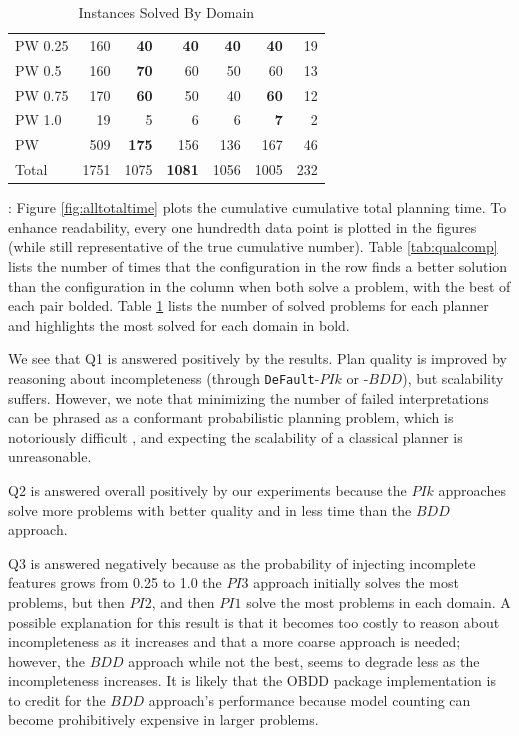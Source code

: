 \documentclass[letterpaper]{article}
\def\und#1{\noindent{\bf #1}:}
\def\default{{\tt DeFault}}
\def\citep#1{\cite{#1}}
\begin{document}
\begin{table}[t]
\begin{tabular}{|l|r|r@{ }r@{ }r@{ }r|r|}
PW 0.25 	&		160		&	{\bf	40}	&	{\bf	40}	&	{\bf	40}	&	{\bf	40}	&	19	\\	
PW 0.5 	&		160		&	{\bf	70}	&		60		&		50		&		60		&	13	\\	
PW 0.75 	&		170		&	{\bf	60}	&		50		&		40		&	{\bf	60}	&	12	\\	
PW 1.0 	&		19		&		5		&		6		&		6		&	{\bf	7}	&	2	\\	\hline
PW 	&		509		&	{\bf	175}	&		156		&		136		&		167		&	46	\\	\hline\hline
Total	&		1751		&		1075		&	{\bf	1081}	&		1056		&		1005		&	232	\\	
\hline																								
\end{tabular}	\caption{\label{tab:solved} Instances Solved By Domain}																							
\end{table}																																												



\und{Off-line Planning Results} Figure \ref{fig:alltotaltime} plots the
cumulative cumulative total planning time.  To enhance readability, every one
hundredth data point is plotted in the figures (while still representative of
the true cumulative number).  Table \ref{tab:qualcomp} lists the number of times
that the configuration in the row finds a better solution than the configuration
in the column when both solve a problem, with the best of each pair bolded.
Table \ref{tab:solved} lists the number of solved problems for each planner and
highlights the most solved for each domain in bold.

We see that Q1 is answered positively by the results.  Plan quality is
improved by reasoning about incompleteness (through \default{}-$PIk$ or -$BDD$),
but scalability suffers.  However, we note that minimizing the number of failed
interpretations  can be phrased as a conformant probabilistic
planning problem, which is notoriously difficult \citep{pff,aij-mclug}, and
expecting the scalability of a classical planner is  unreasonable.

Q2 is answered overall positively by our experiments because the $PIk$
approaches solve more problems with better quality and in less time than the
$BDD$ approach.  

Q3 is answered negatively because as the probability of injecting incomplete
features grows from 0.25 to 1.0 the $PI3$ approach initially solves the most
problems, but then $PI2$, and then $PI1$ solve the most problems in each domain.
A possible explanation for this result is that it becomes too costly to reason
about incompleteness as it increases and that a more coarse approach is needed;
however, the $BDD$ approach while not the best, seems to degrade less as the
incompleteness increases.  It is likely that the OBDD package \citep{jdd}
implementation is to credit for the $BDD$ approach's performance because model
counting can become prohibitively expensive in larger problems.
\end{document}
